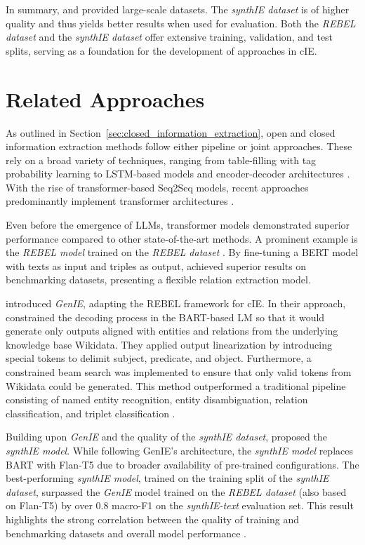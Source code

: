 \documentclass[a4paper,oneside,bibliography=totoc]{scrbook}
\begin{document}
In summary, \citet{HuguetCabot2021} and \citet{Josifoski2023} provided large-scale datasets. The \textit{synthIE dataset} is of higher quality and thus yields better results when used for evaluation. Both the \textit{REBEL dataset} and the \textit{synthIE dataset} offer extensive training, validation, and test splits, serving as a foundation for the development of approaches in \ac{cIE}.

\section{Related Approaches}
\label{sec:related_approaches}

As outlined in Section~\ref{sec:closed_information_extraction}, open and closed information extraction methods follow either pipeline or joint approaches. These rely on a broad variety of techniques, ranging from table-filling with tag probability learning to LSTM-based models and encoder-decoder architectures \cite{Zhang2022,Angeli2015,Trisedya2019}. With the rise of transformer-based Seq2Seq models, recent approaches predominantly implement transformer architectures \cite{Josifoski2021,Josifoski2023,Moeller2024}.

Even before the emergence of \acp{LLM}, transformer models demonstrated superior performance compared to other state-of-the-art methods. A prominent example is the \textit{REBEL model} trained on the \textit{REBEL dataset} \cite{HuguetCabot2021}. By fine-tuning a BERT model with texts as input and triples as output, \citet{HuguetCabot2021} achieved superior results on benchmarking datasets, presenting a flexible relation extraction model.

\citet{Josifoski2021} introduced \textit{GenIE}, adapting the REBEL framework for \ac{cIE}. In their approach, \citet{Josifoski2021} constrained the decoding process in the BART-based \ac{LM} so that it would generate only outputs aligned with entities and relations from the underlying knowledge base Wikidata. They applied output linearization by introducing special tokens to delimit subject, predicate, and object. Furthermore, a constrained beam search was implemented to ensure that only valid tokens from Wikidata could be generated. This method outperformed a traditional pipeline consisting of named entity recognition, entity disambiguation, relation classification, and triplet classification \cite{Josifoski2021}.

Building upon \textit{GenIE} and the quality of the \textit{synthIE dataset}, \citet{Josifoski2023} proposed the \textit{synthIE model}. While following GenIE’s architecture, the \textit{synthIE model} replaces BART with Flan-T5 due to broader availability of pre-trained configurations. The best-performing \textit{synthIE model}, trained on the training split of the \textit{synthIE dataset}, surpassed the \textit{GenIE} model trained on the \textit{REBEL dataset} (also based on Flan-T5) by over 0.8 macro-F1 on the \textit{synthIE-text} evaluation set. This result highlights the strong correlation between the quality of training and benchmarking datasets and overall model performance \cite{Josifoski2023}.
\end{document}
